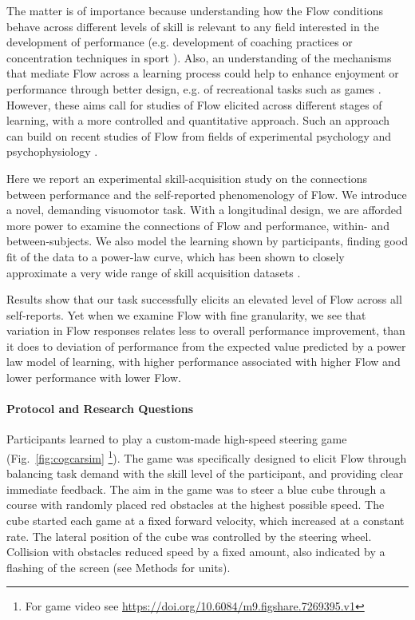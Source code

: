 \documentclass{frontierstyle/frontiersSCNS}
\newcommand{\hl}{\textcolor{red!80}}
\begin{document}
The matter is of importance because understanding how the Flow conditions behave across different levels of skill is relevant to any field interested in the development of performance (e.g. development of coaching practices or concentration techniques in sport \citep{Jackson1996}). Also, an understanding of the mechanisms that mediate Flow across a learning process could help to enhance enjoyment or performance through better design, e.g. of recreational tasks such as games \citep{Chen2007}. However, these aims call for studies of Flow elicited across different stages of learning, with a more controlled and quantitative approach. Such an approach can build on recent studies of Flow from fields of experimental psychology \citep{Harris2017,Keller2008} and psychophysiology \citep{Peifer2012,Peifer2014,Wolf2015,Harmat2015,Labonte-LeMoyne2016}.

Here we report an experimental skill-acquisition study on the connections between performance and the self-reported phenomenology of Flow. We introduce a novel, demanding visuomotor task. With a longitudinal design, we are afforded more power to examine the connections of Flow and performance, within- and between-subjects. \hl{We also model the learning shown by participants, finding good fit of the data to a power-law curve, which has been shown to closely approximate a very wide range of skill acquisition datasets \citep{Newell1982,Logan1988automatize,Palmeri1999powerlaw}.}

Results show that our task successfully elicits an elevated level of Flow across all self-reports. Yet when we examine Flow with fine granularity, we see that variation in Flow responses relates less to overall performance improvement, than it does to deviation of performance from the expected value predicted by a power law model of learning, with higher performance associated with higher Flow and lower performance with lower Flow.


\paragraph*{Protocol and Research Questions}

Participants learned to play a custom-made high-speed steering game (Fig.~\ref{fig:cogcarsim} \footnote{For game video see \url{https://doi.org/10.6084/m9.figshare.7269395.v1}}). The game was specifically designed to elicit Flow through balancing task demand with the skill level of the participant, and providing clear immediate feedback. The aim in the game was to steer a blue cube through a course with randomly placed red obstacles at the highest possible speed. The cube started each game at a fixed forward velocity, which increased at a constant rate. The lateral position of the cube was controlled by the steering wheel. Collision with obstacles reduced speed by a fixed amount, also indicated by a flashing of the screen (see Methods for units).
\end{document}
